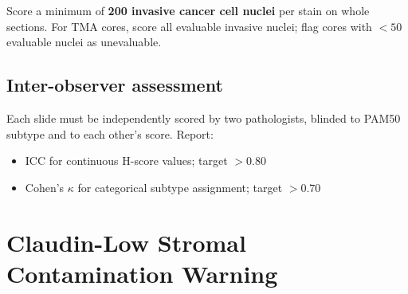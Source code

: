 \documentclass[11pt, a4paper]{article}
\begin{document}
Score a minimum of \textbf{200 invasive cancer
cell nuclei} per stain on whole sections.
For TMA cores, score all evaluable invasive
nuclei; flag cores with $<50$ evaluable
nuclei as unevaluable.

\subsection{Inter-observer assessment}

Each slide must be independently scored by
two pathologists, blinded to PAM50 subtype
and to each other's score. Report:
\begin{itemize}[noitemsep]
    \item ICC for continuous H-score values;
    target $>0.80$
    \item Cohen's $\kappa$ for categorical
    subtype assignment; target $>0.70$
\end{itemize}

\section{Claudin-Low Stromal Contamination
Warning}
\label{sec:clwarning}
\end{document}
